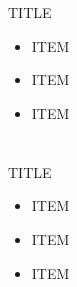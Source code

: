 \documentclass[unicode,12pt]{beamer}
\begin{document}
\section[]{}
\begin{frame}[containsverbatim,c]{%
TITLE}
\begin{center}
\footnotesize
{\setlength{\leftmargini}{12pt}
\setlength{\leftmarginii}{16pt}
\begin{itemize}
 \item
ITEM
 \item
ITEM
 \item
ITEM
\end{itemize}}
\end{center}
\end{frame}

\section[]{}
\begin{frame}[containsverbatim,c]{%
TITLE}
\begin{center}
\footnotesize
{\setlength{\leftmargini}{12pt}
\setlength{\leftmarginii}{16pt}
\begin{itemize}
 \item
ITEM
 \item
ITEM
 \item
ITEM
\end{itemize}}
\end{center}
\end{frame}

 
\end{document}
